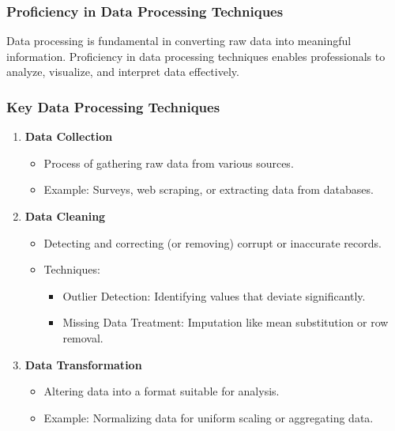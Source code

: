 \documentclass[aspectratio=169]{beamer}
\begin{document}
\begin{frame}
    \frametitle{Proficiency in Data Processing Techniques}
    Data processing is fundamental in converting raw data into meaningful information. Proficiency in data processing techniques enables professionals to analyze, visualize, and interpret data effectively.
\end{frame}

\begin{frame}
    \frametitle{Key Data Processing Techniques}
    \begin{enumerate}
        \item \textbf{Data Collection}
            \begin{itemize}
                \item Process of gathering raw data from various sources.
                \item Example: Surveys, web scraping, or extracting data from databases.
            \end{itemize}
        \item \textbf{Data Cleaning}
            \begin{itemize}
                \item Detecting and correcting (or removing) corrupt or inaccurate records.
                \item Techniques:
                    \begin{itemize}
                        \item Outlier Detection: Identifying values that deviate significantly.
                        \item Missing Data Treatment: Imputation like mean substitution or row removal.
                    \end{itemize}
            \end{itemize}
        \item \textbf{Data Transformation}
            \begin{itemize}
                \item Altering data into a format suitable for analysis.
                \item Example: Normalizing data for uniform scaling or aggregating data.
            \end{itemize}
    \end{enumerate}
\end{frame}
\end{document}
